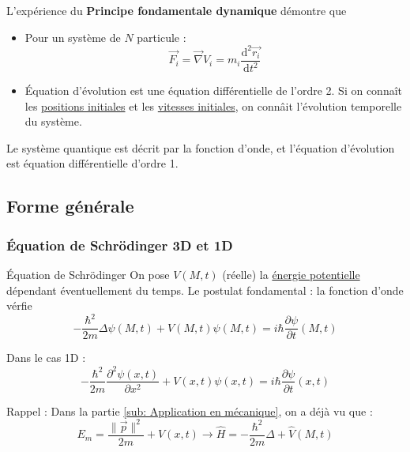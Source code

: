 \begin{note}{}{}
L'expérience du \textbf{Principe fondamentale dynamique} démontre que 
\begin{itemize}

    \item Pour un système de $N$ particule : 
      \begin{equation}
        \overrightarrow{F_i} = \overrightarrow{\nabla} V_i = m_i \frac{\mathrm{d} ^{2} \overrightarrow{r_i}}{\mathrm{d} t ^{2}} 
      \end{equation}

    \item Équation d'évolution est une équation différentielle de l'ordre 2. Si on connaît les \underline{positions initiales} et les \underline{vitesses initiales}, on connâit l'évolution temporelle du système.

\end{itemize}

Le système quantique est décrit par la fonction d'onde, et l'équation d'évolution est équation différentielle d'ordre 1.
\end{note}

\subsection{Forme générale} %

\subsubsection{Équation de Schrödinger 3D et 1D} %

\begin{Theorem}{Équation de Schrödinger}{}
On pose $V(M,t)$ (réelle) la \underline{énergie potentielle} dépendant éventuellement du temps.
Le postulat fondamental : la fonction d'onde vérfie
\begin{equation}
  - \frac{\hbar ^{2}}{2m}  \Delta \psi(M,t) + V(M,t) \psi(M,t) = i \hbar \frac{\partial \psi}{\partial t} (M,t)
\end{equation}

Dans le cas 1D : 
\begin{equation}
  - \frac{\hbar ^{2}}{2m}  \frac{\partial  ^{2} \psi(x,t)}{\partial x ^{2}}  + V(x,t) \psi(x,t) = i \hbar \frac{\partial \psi}{\partial t} (x,t)
\end{equation}
\end{Theorem}

Rappel : Dans la partie \ref{sub: Application en mécanique}, on a déjà vu que : 
\begin{equation}
  E_m = \frac{ \| \overrightarrow{p} \| ^{2}}{2m} + V(x,t)\to \hat{H} = - \frac{\hbar ^{2}}{2m} \Delta + \hat{V}(M,t)
\end{equation}

